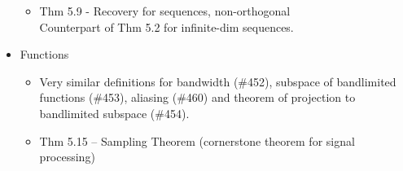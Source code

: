 \documentclass{article}
\newcommand{\cg}{\color{gray}}
\newcommand{\fs}{\footnotesize}
\begin{document}
\begin{itemize}
\begin{itemize}
\item Thm 5.9 \-- Recovery for sequences, non-orthogonal \\
{\cg\fs Counterpart of Thm 5.2 for infinite-dim sequences.}
\end{itemize}
\item Functions
\begin{itemize}
	\item Very similar definitions for {\cg bandwidth (\#452), subspace of bandlimited functions (\#453), aliasing (\#460) and theorem of projection to bandlimited subspace (\#454).}
	\item Thm 5.15 -- Sampling Theorem (cornerstone theorem for signal processing)
\end{itemize}
\end{itemize}






	
\end{document}
